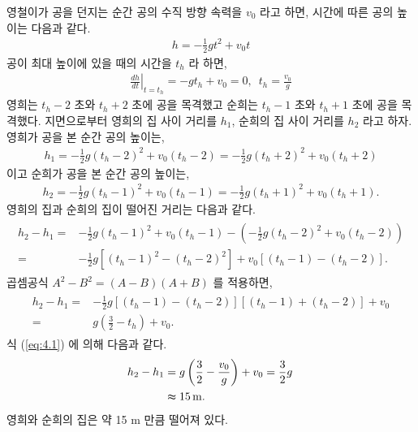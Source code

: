 \documentclass[floatfix,nofootinbib,superscriptaddress,fleqn,preprint]{revtex4}
\begin{document}
영철이가 공을 던지는 순간 공의 수직 방향 속력을 $v_0$ 라고 하면, 
시간에 따른 공의 높이는 다음과 같다.
\begin{align}
  h = -\frac{1}{2}gt^2+v_0t
\end{align} 공이 최대 높이에 있을 때의 시간을 $t_h$ 라 하면,
\begin{align}\label{eq:4.1}
  \left.\frac{dh}{dt}\right|_{t=t_h} = -gt_h+v_0=0,\,\,\,t_h=\frac{v_0}{g}
\end{align}
영희는 $t_h-2$ 초와
$t_h+2$ 초에 공을 목격했고 순희는 $t_h-1$ 초와 $t_h+1$ 초에 공을 목격했다.
지면으로부터 영희의 집 사이 거리를 $h_1$, 순희의 집 사이 거리를 $h_2$ 라고 하자. 
영희가 공을 본 순간 공의 높이는,
\begin{align}
  h_1 = -\frac{1}{2}g(t_h-2)^2+v_0(t_h-2) 
  = -\frac{1}{2}g(t_h+2)^2+v_0(t_h+2) 
\end{align}
이고 순희가 공을 본 순간 공의 높이는,
\begin{align}
  h_2 = -\frac{1}{2}g(t_h-1)^2+v_0(t_h-1) 
  = -\frac{1}{2}g(t_h+1)^2+v_0(t_h+1) .
\end{align}
영희의 집과 순희의 집이 떨어진 거리는 다음과 같다.
\begin{align}
  \begin{split}
    h_2-h_1 =& -\frac{1}{2}g(t_h-1)^2+v_0(t_h-1) 
    -\left( -\frac{1}{2}g(t_h-2)^2+v_0(t_h-2) \right) \\
    =& -\frac{1}{2}g\left[ \left(t_h-1\right)^2
    -\left(t_h-2\right)^2 \right]
    +v_0[ (t_h-1) - (t_h-2) ].
  \end{split}
\end{align}
곱셈공식 $A^2-B^2=(A-B)(A+B)$ 를 적용하면,
\begin{align}
  \begin{split}
    h_2-h_1 =&-\frac{1}{2}g[(t_h-1)-(t_h-2)][(t_h-1)+(t_h-2)]
    +v_0  \\
    =&g\left(\frac{3}{2}-t_h\right)+v_0.
  \end{split}
\end{align}
식 (\ref{eq:4.1}) 에 의해 다음과 같다.
\begin{align}
  \begin{split}
    h_2-h_1 &= g\left(\frac{3}{2}-\frac{v_0}{g}\right)+v_0 
    =\frac{3}{2}g \,  \\
    &\thickapprox 15\,\mathrm{m}.
  \end{split}
\end{align}
영희와 순희의 집은 약 15 m 만큼 떨어져 있다.
\end{document}
